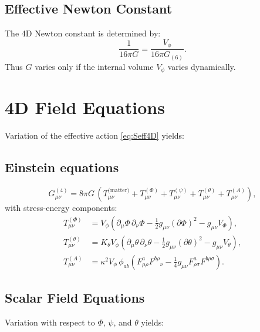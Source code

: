\documentclass[12pt]{article}
\begin{document}
\subsection{Effective Newton Constant}

The 4D Newton constant is determined by:
\begin{equation}
\frac{1}{16\pi G}
=
\frac{V_\phi}{16\pi G_{(6)}}.
\label{eq:Newton}
\end{equation}
Thus \(G\) varies only if the internal volume \(V_\phi\) varies dynamically.


\newpage
\section{4D Field Equations}

Variation of the effective action \eqref{eq:Seff4D} yields:

\subsection{Einstein equations}

\begin{equation}
G_{\mu\nu}^{(4)}
=
8\pi G\,
\left(
T_{\mu\nu}^{\text{(matter)}}
+ T_{\mu\nu}^{(\Phi)}
+ T_{\mu\nu}^{(\psi)}
+ T_{\mu\nu}^{(\theta)}
+ T_{\mu\nu}^{(A)}
\right),
\label{eq:Einstein4D}
\end{equation}
with stress-energy components:
\begin{align}
T_{\mu\nu}^{(\Phi)}
&=
V_\phi
\left(
\partial_\mu\Phi\,\partial_\nu\Phi
-\frac{1}{2}g_{\mu\nu}(\partial\Phi)^2
- g_{\mu\nu} V_\Phi
\right),
\\[4pt]
T_{\mu\nu}^{(\theta)}
&=
K_\theta V_\phi
\left(
\partial_\mu\theta\,\partial_\nu\theta
-\frac{1}{2}g_{\mu\nu}(\partial\theta)^2
- g_{\mu\nu}V_\theta
\right),
\\[4pt]
T_{\mu\nu}^{(A)}
&=
\kappa^2 V_\phi\,
\phi_{ab}\left(
F^a_{\mu\rho}F^{b\rho}{}_{\nu}
-\frac{1}{4}g_{\mu\nu}F^a_{\rho\sigma}F^{b\rho\sigma}
\right).
\end{align}


\subsection{Scalar Field Equations}

Variation with respect to \(\Phi\), \(\psi\), and \(\theta\) yields:
\end{document}

